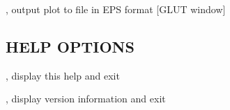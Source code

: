 \begin{Description}

\item[\Opt{-o}, \OptArg{--output}{ file}] output plot to file in EPS format [GLUT window]

\end{Description}


\subsection{HELP OPTIONS}

\begin{Description}

\item[\Opt{-h}, \Opt{--help }] display this help and exit
\item[\Opt{-V}, \Opt{--version}] display version information and exit

\end{Description}


\LatexManEnd
